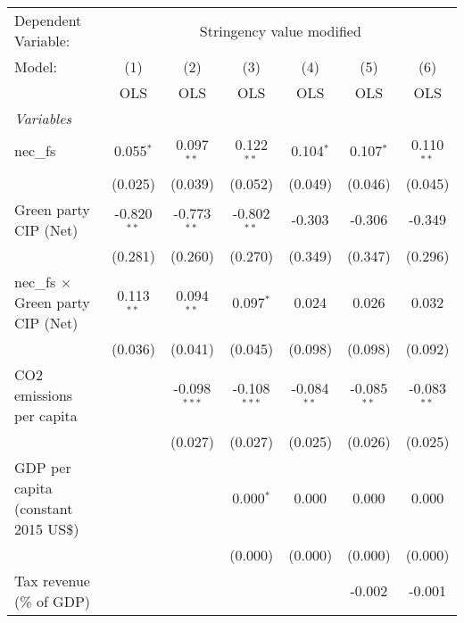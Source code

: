 
\begingroup
\centering
\begin{tabular}{lcccccc}
   \toprule
   Dependent Variable: & \multicolumn{6}{c}{Stringency value modified}\\
   Model:                                   & (1)           & (2)            & (3)            & (4)           & (5)           & (6)\\  
                                            &  OLS          & OLS            & OLS            & OLS           & OLS           & OLS\\  
   \midrule
   \emph{Variables}\\
   nec\_fs                                  & 0.055$^{*}$   & 0.097$^{**}$   & 0.122$^{**}$   & 0.104$^{*}$   & 0.107$^{*}$   & 0.110$^{**}$\\   
                                            & (0.025)       & (0.039)        & (0.052)        & (0.049)       & (0.046)       & (0.045)\\   
   Green party CIP (Net)                    & -0.820$^{**}$ & -0.773$^{**}$  & -0.802$^{**}$  & -0.303        & -0.306        & -0.349\\   
                                            & (0.281)       & (0.260)        & (0.270)        & (0.349)       & (0.347)       & (0.296)\\   
   nec\_fs $\times$ Green party CIP (Net)   & 0.113$^{**}$  & 0.094$^{**}$   & 0.097$^{*}$    & 0.024         & 0.026         & 0.032\\   
                                            & (0.036)       & (0.041)        & (0.045)        & (0.098)       & (0.098)       & (0.092)\\   
   CO2 emissions per capita                 &               & -0.098$^{***}$ & -0.108$^{***}$ & -0.084$^{**}$ & -0.085$^{**}$ & -0.083$^{**}$\\   
                                            &               & (0.027)        & (0.027)        & (0.025)       & (0.026)       & (0.025)\\   
   GDP per capita (constant 2015 US\$)      &               &                & 0.000$^{*}$    & 0.000         & 0.000         & 0.000\\   
                                            &               &                & (0.000)        & (0.000)       & (0.000)       & (0.000)\\   
   Tax revenue (\% of GDP)                  &               &                &                &               & -0.002        & -0.001\\   

\end{tabular}
